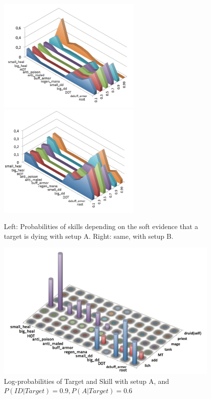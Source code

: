 \begin{figure}[h!]
\begin{center}
\includegraphics[width=7cm]{images/wow_distrib_skill1.png} \includegraphics[width=7cm]{images/wow_distrib_skill2.png}
\caption{Left: Probabilities of skills depending on the soft evidence that a target is dying with setup A. Right: same, with setup B.}
\label{fig:wow_skill}
\end{center}
\end{figure}

\begin{figure}[h!]
\begin{center}
\includegraphics[width=11cm]{images/wow_distrib_target_skill.png}
\caption{Log-probabilities of Target and Skill with setup A, and $P(ID|Target)=0.9, P(A|Target)=0.6$}
\label{fig:wow_target_skill}
\end{center}
\end{figure}

